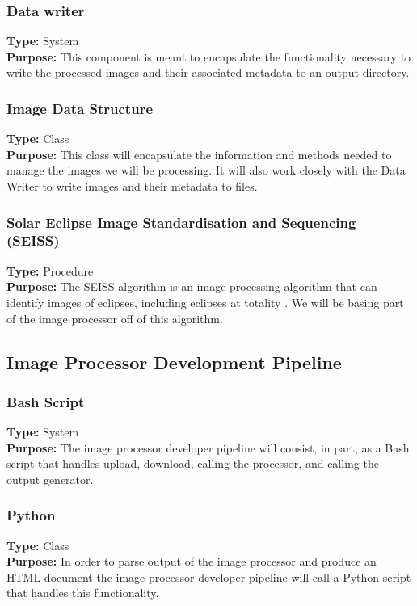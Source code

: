 \documentclass[10pt, onecolumn, draftclsnofoot, letterpaper, compsoc]{IEEEtran}
\begin{document}
\subsubsection{Data writer}
\textbf{Type:} System\\
\textbf{Purpose:} This component is meant to encapsulate the functionality
necessary to write the processed images and their associated metadata to an
output directory.\\

\subsubsection{Image Data Structure}
\textbf{Type:} Class\\
\textbf{Purpose:} This class will encapsulate the information and methods needed to manage the images we will be processing. It will also work closely with the Data Writer to write images and their metadata to files.\\

\subsubsection{Solar Eclipse Image Standardisation and Sequencing (SEISS)}
\textbf{Type:} Procedure\\
\textbf{Purpose:} The SEISS algorithm is an image processing algorithm that can
identify images of eclipses, including eclipses at totality \cite{imgKrista}.
We will be basing part of the image processor off of this algorithm. \\

\subsection{Image Processor Development Pipeline}

    \subsubsection{Bash Script}
    \textbf{Type:} System \\
    \textbf{Purpose:} The image processor developer pipeline will consist, in
    part, as a Bash script that handles upload, download, calling the processor,
    and calling the output generator. \\

    \subsubsection{Python}
    \textbf{Type:} Class \\
    \textbf{Purpose:} In order to parse output of the image processor and
    produce an HTML document the image processor developer pipeline will call a
    Python script that handles this functionality. \\
\end{document}
